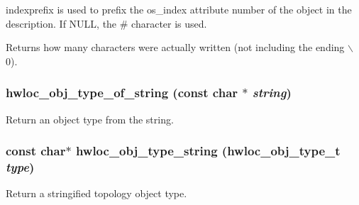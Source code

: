 {\ttfamily indexprefix} is used to prefix the {\ttfamily os\_\-index} attribute number of the object in the description. If {\ttfamily NULL}, the {\ttfamily \#} character is used.

\begin{DoxyReturn}{Returns}
how many characters were actually written (not including the ending $\backslash$0). 
\end{DoxyReturn}
\hypertarget{group__hwlocality__conversion_ga8a1eee67a1de115d264719157c109a20}{
\subsubsection[{hwloc\_\-obj\_\-type\_\-of\_\-string}]{ hwloc\_\-obj\_\-type\_\-of\_\-string (const char $\ast$ {\em string})}}
\label{group__hwlocality__conversion_ga8a1eee67a1de115d264719157c109a20}


Return an object type from the string. \hypertarget{group__hwlocality__conversion_ga5ca0bf94bbbb080d0eff17a57bd90422}{
\subsubsection[{hwloc\_\-obj\_\-type\_\-string}]{\setlength{\rightskip}{0pt plus 5cm}const char$\ast$ hwloc\_\-obj\_\-type\_\-string ({\bf hwloc\_\-obj\_\-type\_\-t} {\em type})}}
\label{group__hwlocality__conversion_ga5ca0bf94bbbb080d0eff17a57bd90422}


Return a stringified topology object type. 
